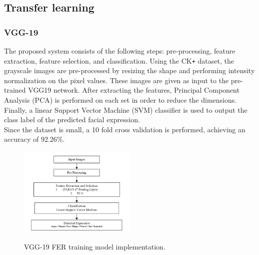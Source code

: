 \documentclass[12pt,a4paper,oneside,english]{book}
\begin{document}
\subsection{Transfer learning}
\subsubsection{VGG-19}
The proposed system consists of the following steps: pre-processing, feature extraction, feature selection, and classification. Using the CK\texttt{+} dataset, the grayscale images are pre-processed by resizing the shape and performing intensity normalization on the pixel values. These images are given as input to the pre-trained VGG19 network. After extracting the features, Principal Component Analysis (PCA) is performed on each set in order to reduce the dimensions. Finally, a linear Support Vector Machine (SVM) classifier is used to output the class label of the predicted facial expression.\\
Since the dataset is small, a 10 fold cross validation is performed, achieving an accuracy of 92.26\%.
\begin{figure}[H]
    \centering
    \includegraphics[width=0.5\textwidth]{figures/State of art/vggmodelarchitecture.PNG}
    \caption{VGG-19 FER training model implementation.}
    \label{fig:vgg19architecture}
    \cite{vgg19article}
\end{figure}
\noindent
\end{document}
